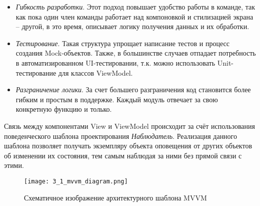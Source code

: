 \begin{itemize}
    \item \emph{Гибкость разработки}.
    Этот подход повышает удобство работы в команде, так как пока один член команды работает над компоновкой и стилизацией экрана -- другой, в это время, описывает логику получения данных и их обработки.
    \item \emph{Тестирование}.
    Такая структура упрощает написание тестов и процесс создания Mock-объектов.
    Также, в большинстве случаев отпадает потребность в автоматизированном UI-тестировании, т.к. можно использовать Unit-тестирование для классов ViewModel.
    \item \emph{Разграничение логики}.
    За счет большего разграничения код становится более гибким и простым в поддержке.
    Каждый модуль отвечает за свою конкретную функцию и только.
\end{itemize}

Связь между компонентами View и ViewModel происходит за счёт использования поведенческого шаблона проектирования \emph{Наблюдатель}.
Реализация данного шаблона позволяет получать экземпляру объекта оповещения от других объектов об изменении их состояния, тем самым наблюдая за ними без прямой связи с этими.

\begin{figure}[H]
    \centering
    \texttt{[image: 3\_1\_mvvm\_diagram.png]}
    \caption{Схематичное изображение архитектурного шаблона MVVM}
    \label{fig:design:architecture:mvvm}
\end{figure}